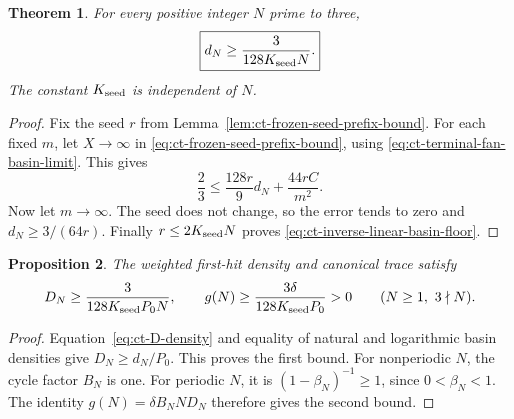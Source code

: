 \documentclass[11pt,a4paper]{article}
\newtheorem{theorem}{Theorem}
\newtheorem{proposition}[theorem]{Proposition}
\begin{document}
\begin{theorem}\label{thm:ct-inverse-linear-basin-floor}
For every positive integer \(N\) prime to three,
\begin{equation}\label{eq:ct-inverse-linear-basin-floor}
 \boxed{\displaystyle
 d_N\ge\frac{3}{128K_{\rm seed}N}.}
\end{equation}
The constant \(K_{\rm seed}\) is independent of \(N\).
\end{theorem}
\begin{proof}
Fix the seed \(r\) from Lemma~\ref{lem:ct-frozen-seed-prefix-bound}.
For each fixed \(m\), let \(X\to\infty\) in
\eqref{eq:ct-frozen-seed-prefix-bound}, using
\eqref{eq:ct-terminal-fan-basin-limit}. This gives
\[
 \frac23\le\frac{128r}{9}d_N+\frac{44rC}{m^2}.
\]
Now let \(m\to\infty\). The seed does not change, so the error
tends to zero and \(d_N\ge3/(64r)\). Finally
\(r\le2K_{\rm seed}N\) proves
\eqref{eq:ct-inverse-linear-basin-floor}.
\end{proof}

\begin{proposition}\label{prop:ct-uniform-canonical-floor}
The weighted first-hit density and canonical trace satisfy
\begin{equation}\label{eq:ct-uniform-canonical-floor}
 D_N\ge\frac{3}{128K_{\rm seed}P_0N},\qquad
 g(N)\ge\frac{3\delta}{128K_{\rm seed}P_0}>0
       \qquad(N\ge1,\ 3\nmid N).
\end{equation}
\end{proposition}
\begin{proof}
Equation~\eqref{eq:ct-D-density} and equality of natural and logarithmic
basin densities give \(D_N\ge d_N/P_0\). This proves the first
bound. For nonperiodic \(N\), the cycle factor \(B_N\) is one.
For periodic \(N\), it is \((1-\beta_N)^{-1}\ge1\), since
\(0<\beta_N<1\). The identity
\(g(N)=\delta B_NND_N\) therefore gives the second bound.
\end{proof}
\end{document}
